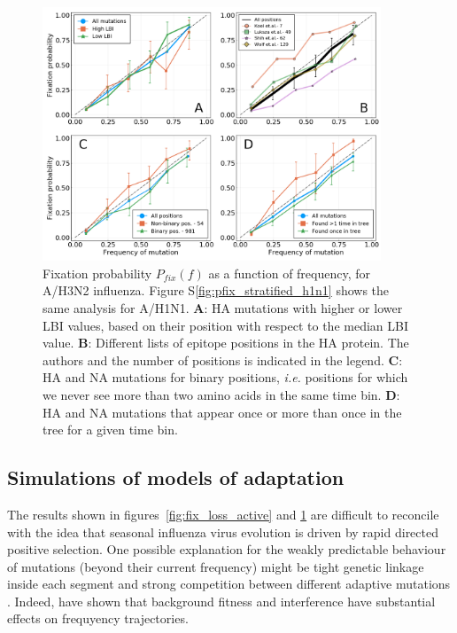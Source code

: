 \documentclass[reprint,amsmath,amssymb,superscriptaddress,showpacs,rmp]{revtex4-1}
\newcommand{\sref}[1]{S\ref{#1}}
\begin{document}
\begin{figure}
	\centering
	\includegraphics[width=0.9\textwidth]{./Figures/Panel3.png}
	\caption{Fixation probability $P_{fix}(f)$ as a function of frequency, for A/H3N2 influenza. Figure \sref{fig:pfix_stratified_h1n1} shows the same analysis for A/H1N1. \textbf{A}: HA mutations with higher or lower LBI values, based on their position with respect to the median LBI value. \textbf{B}: Different lists of epitope positions in the HA protein. The authors and the number of positions is indicated in the legend. \textbf{C}: HA and NA mutations for binary positions, \emph{i.e.} positions for which we never see more than two amino acids in the same time bin. \textbf{D}: HA and NA mutations that appear once or more than once in the tree for a given time bin.}
	\label{fig:pfix_stratified}
\end{figure}

\subsection*{Simulations of models of adaptation}
\label{sub:a_simple_model}

The results shown in figures~\ref{fig:fix_loss_active} and \ref{fig:pfix_stratified} are difficult to reconcile with the idea that seasonal influenza virus evolution is driven by rapid directed positive selection.
One possible explanation for the weakly predictable behaviour of mutations (beyond their current frequency) might be tight genetic linkage inside each segment and strong competition between different adaptive mutations \citep{neher_genetic_2011,strelkowa_clonal_2012}.
Indeed, \citet{illingworth_components_2012} have shown that background fitness and interference have substantial effects on frequyency trajectories.
\end{document}
